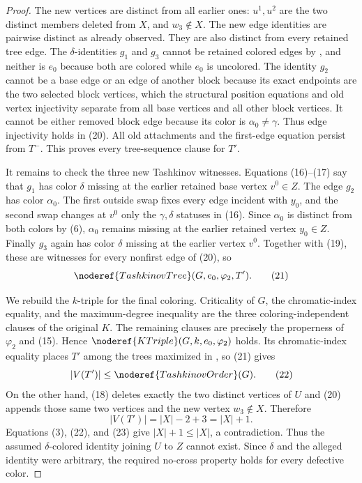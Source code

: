 \begin{proof}
The new vertices are distinct from all earlier ones: $u^1,u^2$ are the
two distinct members deleted from $X$, and $w_3\notin X$.  The new edge
identities are pairwise distinct as already observed.  They are also
distinct from every retained tree edge.  The $\delta$-identities $g_1$
and $g_3$ cannot be retained colored edges by
, and neither is $e_0$ because both
are colored while $e_0$ is uncolored.  The identity $g_2$ cannot be a
base edge or an edge of another block because its exact endpoints are the
two selected block vertices, which the structural position equations and
old vertex injectivity separate from all base vertices and all other block
vertices.  It cannot be either removed block edge because its color is
$\alpha_0\ne\gamma$.  Thus edge injectivity holds in (20).  All old
attachments and the first-edge equation persist from $T^-$.  This proves
every tree-sequence clause for $T'$.

It remains to check the three new Tashkinov witnesses.  Equations
(16)--(17) say that $g_1$ has color $\delta$ missing at the earlier
retained base vertex $v^0\in Z$.  The edge $g_2$ has color $\alpha_0$.
The first outside swap fixes every edge incident with $y_0$, and the
second swap changes at $v^0$ only the $\gamma,\delta$ statuses in (16).
Since $\alpha_0$ is distinct from both colors by (6), $\alpha_0$ remains
missing at the earlier retained vertex $y_0\in Z$.  Finally $g_3$ again
has color $\delta$ missing at the earlier vertex $v^0$.  Together with
(19), these are witnesses for every nonfirst edge of (20), so
\[
 \noderef{TashkinovTree}(G,e_0,\varphi_2,T').                 \tag{21}
\]

We rebuild the $k$-triple for the final coloring.  Criticality of $G$, the
chromatic-index equality, and the maximum-degree inequality are the three
coloring-independent clauses of the original  $K$.
The remaining clauses are precisely the properness of $\varphi_2$ and
(15).  Hence $\noderef{KTriple}(G,k,e_0,\varphi_2)$ holds.  Its
chromatic-index equality places $T'$ among the trees maximized in
, so (21) gives
\[
 |V(T')|\le \noderef{TashkinovOrder}(G).                       \tag{22}
\]
On the other hand, (18) deletes exactly the two distinct vertices of $U$
and (20) appends those same two vertices and the new vertex
$w_3\notin X$.  Therefore
\[
 |V(T')|=|X|-2+3=|X|+1.                                      \tag{23}
\]
Equations (3), (22), and (23) give $|X|+1\le|X|$, a contradiction.
Thus the assumed $\delta$-colored identity joining $U$ to $Z$ cannot
exist.  Since $\delta$ and the alleged identity were arbitrary, the
required no-cross property holds for every defective color.
\end{proof}
